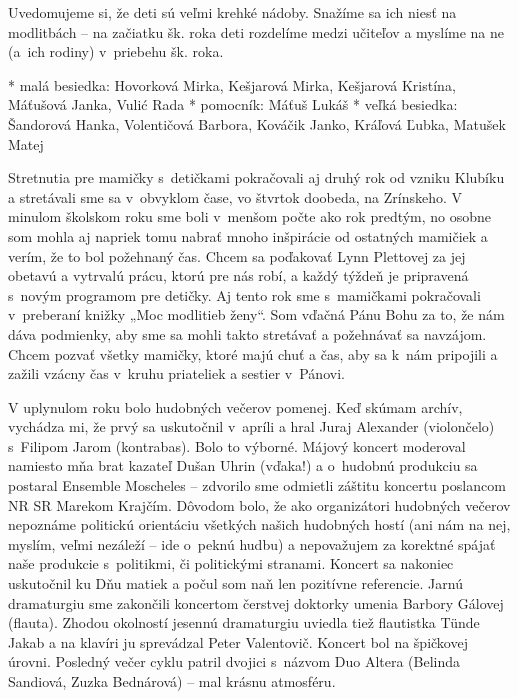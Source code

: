 
Uvedomujeme si, že deti sú veľmi krehké nádoby. Snažíme sa ich niesť na modlitbách – na začiatku šk. roka deti rozdelíme medzi učiteľov a myslíme na ne (a~ich rodiny) v~priebehu šk. roka.


\begitems
* malá besiedka: Hovorková Mirka, Kešjarová Mirka, Kešjarová Kristína, Máťušová Janka, Vulić Rada
* pomocník: Máťuš Lukáš
* veľká besiedka: Šandorová Hanka, Volentičová Barbora, Kováčik Janko, Kráľová Ľubka, Matušek Matej
\enditems
{}


Stretnutia pre mamičky s~detičkami pokračovali aj druhý rok od vzniku Klubíku a stretávali sme sa v~obvyklom čase, vo štvrtok doobeda, na Zrínskeho. V minulom školskom roku sme boli v~menšom počte ako rok predtým, no osobne som mohla aj napriek tomu nabrať mnoho inšpirácie od ostatných mamičiek a verím, že to bol požehnaný čas. Chcem sa poďakovať Lynn Plettovej za jej obetavú a vytrvalú prácu, ktorú pre nás robí, a každý týždeň je pripravená s~novým programom pre detičky. Aj tento rok sme s~mamičkami pokračovali v~preberaní knižky „Moc modlitieb ženy“. Som vďačná Pánu Bohu za to, že nám dáva podmienky, aby sme sa mohli takto stretávať a požehnávať sa navzájom. Chcem pozvať všetky mamičky, ktoré majú chuť a čas, aby sa k~nám pripojili a zažili vzácny čas v~kruhu priateliek a sestier v~Pánovi.



V uplynulom roku bolo hudobných večerov pomenej. Keď skúmam archív, vychádza mi, že prvý sa uskutočnil v~apríli a hral Juraj Alexander (violončelo) s~Filipom Jarom (kontrabas). Bolo to výborné. Májový koncert moderoval namiesto mňa brat kazateľ Dušan Uhrin (vďaka!) a o~hudobnú produkciu sa postaral Ensemble Moscheles – zdvorilo sme odmietli záštitu koncertu poslancom NR SR Marekom Krajčím. Dôvodom bolo, že ako organizátori hudobných večerov nepoznáme politickú orientáciu všetkých našich hudobných hostí (ani nám na nej, myslím, veľmi nezáleží – ide o~peknú hudbu) a nepovažujem za korektné spájať naše produkcie s~politikmi, či politickými stranami. Koncert sa nakoniec uskutočnil ku Dňu matiek a počul som naň len pozitívne referencie. Jarnú dramaturgiu sme zakončili koncertom čerstvej doktorky umenia Barbory Gálovej (flauta). Zhodou okolností jesennú dramaturgiu uviedla tiež flautistka Tünde Jakab a na klavíri ju sprevádzal Peter Valentovič. Koncert bol na špičkovej úrovni. Posledný večer cyklu patril dvojici s~názvom Duo Altera (Belinda Sandiová, Zuzka Bednárová) – mal krásnu atmosféru.

